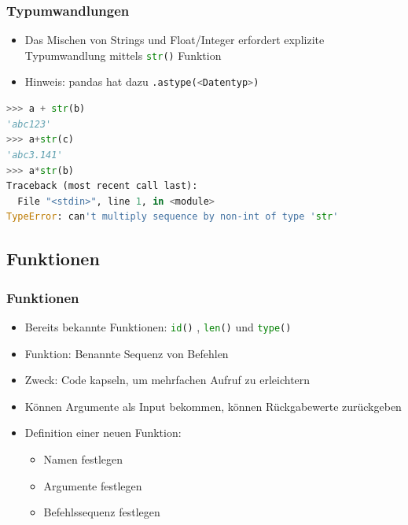\documentclass[ngerman]{beamer}
\begin{document}
\begin{frame}[containsverbatim]
\frametitle{Typumwandlungen}

\begin{itemize}
\item Das Mischen von Strings und Float/Integer erfordert explizite Typumwandlung mittels \lstinline[language={Python}]{str()} Funktion
\item Hinweis: pandas hat dazu \lstinline[morekeywords={astype},language={Python}]{.astype(<Datentyp>)} 
\end{itemize}

\begin{lstlisting}[language={Python}]
>>> a + str(b)
'abc123'
>>> a+str(c)
'abc3.141'
>>> a*str(b)
Traceback (most recent call last):
  File "<stdin>", line 1, in <module>
TypeError: can't multiply sequence by non-int of type 'str'
\end{lstlisting}


\end{frame}

\subsection{Funktionen}


\begin{frame}
\frametitle{Funktionen}

\begin{itemize}
\item Bereits bekannte Funktionen:  \lstinline[language={Python}]{id()} ,
\lstinline[language={Python}]{len()} 
und \lstinline[language={Python}]{type()} 
\item Funktion: Benannte Sequenz von Befehlen
\item Zweck: Code kapseln, um mehrfachen Aufruf  zu erleichtern
\item Können Argumente als Input bekommen, können Rückgabewerte zurückgeben
\item Definition einer neuen Funktion:
\begin{itemize}
	\item Namen festlegen
	\item Argumente festlegen
	\item Befehlssequenz festlegen
	\end{itemize}
\end{itemize}
\end{frame}
\end{document}

